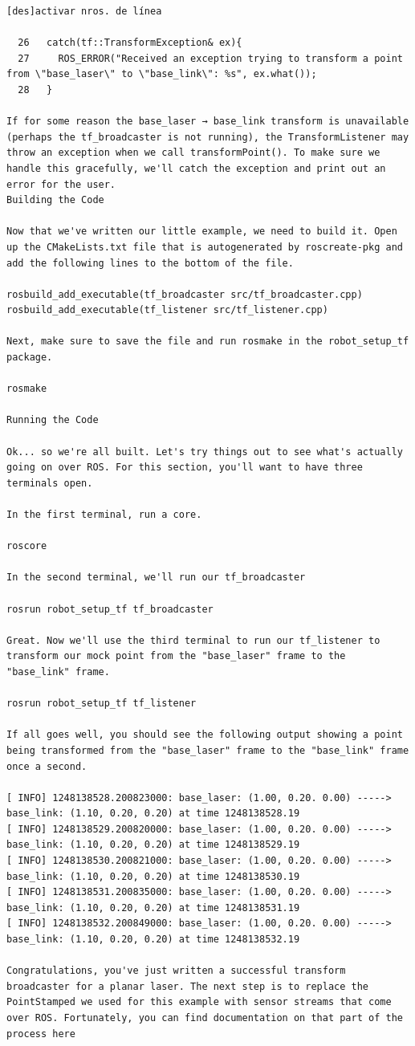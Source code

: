 \begin{verbatim}
[des]activar nros. de línea

  26   catch(tf::TransformException& ex){
  27     ROS_ERROR("Received an exception trying to transform a point from \"base_laser\" to \"base_link\": %s", ex.what());
  28   }

If for some reason the base_laser → base_link transform is unavailable (perhaps the tf_broadcaster is not running), the TransformListener may throw an exception when we call transformPoint(). To make sure we handle this gracefully, we'll catch the exception and print out an error for the user.
Building the Code

Now that we've written our little example, we need to build it. Open up the CMakeLists.txt file that is autogenerated by roscreate-pkg and add the following lines to the bottom of the file.

rosbuild_add_executable(tf_broadcaster src/tf_broadcaster.cpp)
rosbuild_add_executable(tf_listener src/tf_listener.cpp)

Next, make sure to save the file and run rosmake in the robot_setup_tf package.

rosmake

Running the Code

Ok... so we're all built. Let's try things out to see what's actually going on over ROS. For this section, you'll want to have three terminals open.

In the first terminal, run a core.

roscore

In the second terminal, we'll run our tf_broadcaster

rosrun robot_setup_tf tf_broadcaster

Great. Now we'll use the third terminal to run our tf_listener to transform our mock point from the "base_laser" frame to the "base_link" frame.

rosrun robot_setup_tf tf_listener

If all goes well, you should see the following output showing a point being transformed from the "base_laser" frame to the "base_link" frame once a second.

[ INFO] 1248138528.200823000: base_laser: (1.00, 0.20. 0.00) -----> base_link: (1.10, 0.20, 0.20) at time 1248138528.19
[ INFO] 1248138529.200820000: base_laser: (1.00, 0.20. 0.00) -----> base_link: (1.10, 0.20, 0.20) at time 1248138529.19
[ INFO] 1248138530.200821000: base_laser: (1.00, 0.20. 0.00) -----> base_link: (1.10, 0.20, 0.20) at time 1248138530.19
[ INFO] 1248138531.200835000: base_laser: (1.00, 0.20. 0.00) -----> base_link: (1.10, 0.20, 0.20) at time 1248138531.19
[ INFO] 1248138532.200849000: base_laser: (1.00, 0.20. 0.00) -----> base_link: (1.10, 0.20, 0.20) at time 1248138532.19

Congratulations, you've just written a successful transform broadcaster for a planar laser. The next step is to replace the PointStamped we used for this example with sensor streams that come over ROS. Fortunately, you can find documentation on that part of the process here
 
\end{verbatim}

